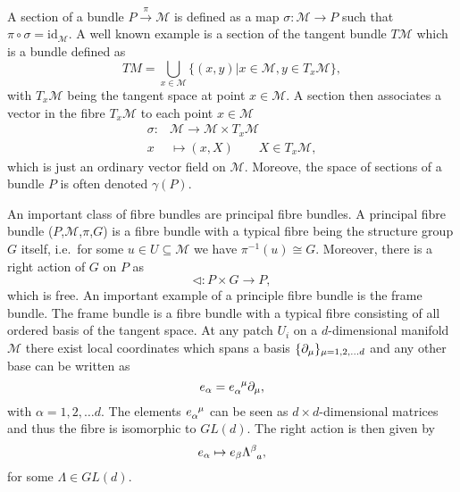 A section of a bundle $P\overset{\pi}{\longrightarrow}\mathcal{M}$ is defined as a map $\sigma: \mathcal{M}\to P$ such that $\pi\circ\sigma = \text{id}_{\mathcal{M}}$. A well known example is a section of the tangent bundle $T\mathcal{M}$ which is a bundle defined as
\begin{equation}
    TM = \bigcup_{x\in \mathcal{M}}\{(x,y)|x\in\mathcal{M}, y\in T_x\mathcal{M} \},
\end{equation}
with $T_x\mathcal{M}$ being the tangent space at point $x\in\mathcal{M}$. A section then associates a vector in the fibre $T_x\mathcal{M}$ to each point $x\in\mathcal{M}$
\begin{equation}
    \begin{aligned}
        \sigma: &\mathcal{M}\to \mathcal{M}\times T_x\mathcal{M}\\
                x&\mapsto (x,X)\qquad X\in T_x\mathcal{M},
    \end{aligned}
\end{equation}
which is just an ordinary vector field on $\mathcal{M}$. Moreove, the space of sections of a bundle $P$ is often denoted $\gamma(P)$. 


An important class of fibre bundles are principal fibre bundles. A principal fibre bundle ($P$,$\mathcal{M}$,$\pi$,$G$) is a fibre bundle with a typical fibre being the structure group $G$ itself, i.e.\ for some $u\in U\subseteq \mathcal{M}$ we have $\pi^{-1}(u)\cong G$. Moreover, there is a right action of $G$ on $P$ as 
\begin{equation}
    \triangleleft: P\times G \to P,
\end{equation}
which is free. An important example of a principle fibre bundle is the frame bundle. The frame bundle is a fibre bundle with a typical fibre consisting of all ordered basis of the tangent space. At any patch $U_i$ on a $d$-dimensional manifold $\mathcal{M}$ there exist local coordinates which spans a basis $\{\partial_\mu\}_{\mu=1,2,\ldots d}$ and any other base can be written as 
\begin{equation}
    e_\alpha = \tensor{e}{_\alpha^\mu}\pd_\mu,
\end{equation}
with $\alpha=1,2,\ldots d$. The elements $\tensor{e}{_\alpha^\mu}$ can be seen as $d\times d$-dimensional matrices and thus the fibre is isomorphic to $GL(d)$. The right action is then given by 
\begin{equation}
    e_\alpha \mapsto e_\beta \tensor{\Lambda}{^\beta_a},
\end{equation}
for some $\Lambda\in GL(d)$. 

